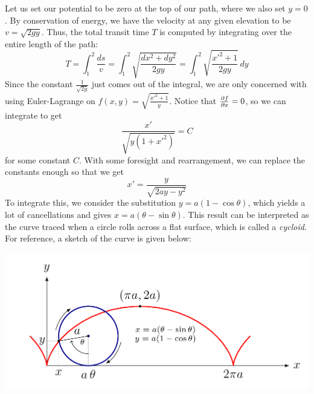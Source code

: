 \begin{solution}
Let us set our potential to be zero at the top of our path, where we also set $y = 0$. By conservation of energy, we have the velocity at any given elevation to be $v = \sqrt{2gy}$. Thus, the total transit time $T$ is computed by integrating over the entire length of the path: 
\[
	T = \int_1^2 \frac{ds}{v} = \int_1^2 \sqrt{\frac{dx^2 + dy^2}{2gy}} = \int_1^2 \sqrt{\frac{x'^2  + 1}{2gy}} \, dy 
\]
Since the constant $\frac{1}{\sqrt{2g}}$ just comes out of the integral, we are only concerned with using Euler-Lagrange on $f(x, y) = \sqrt{\frac{x'^2  + 1}{y}}$. Notice that $\frac{\partial f}{\partial x} = 0$, so we can integrate to get
\[
	\frac{x'}{\sqrt{y(1 + x'^2)}} = C
\]
for some constant $C$. With some foresight and rearrangement, we can replace the constants enough so that we get 
\[
	x' = \frac{y}{\sqrt{2ay-y^2}}
\]
To integrate this, we consider the substitution $y = a(1-\cos\theta)$, which yields a lot of cancellations and gives $x = a(\theta - \sin \theta)$. This result can be interpreted as the curve traced when a circle rolls across a flat surface, which is called a \textit{cycloid}. For reference, a sketch of the curve is given below: 
\begin{center}
\includegraphics[scale=0.3]{images/mechadv/cycloid.png}
\end{center}

\end{solution}

